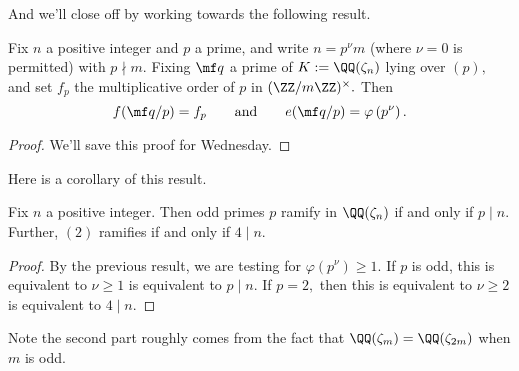 \documentclass[../notes.tex]{subfiles}
\begin{document}
And we'll close off by working towards the following result.
\begin{proposition}
	Fix $n$ a positive integer and $p$ a prime, and write $n=p^\nu m$ (where $\nu=0$ is permitted) with $p\nmid m.$ Fixing $\mf q$ a prime of $K:=\QQ(\zeta_n)$ lying over $(p),$ and set $f_p$ the multiplicative order of $p$ in $(\ZZ/m\ZZ)^\times.$ Then
	\[f(\mf q/p)=f_p\qquad\text{and}\qquad e(\mf q/p)=\varphi\left(p^\nu\right).\]
\end{proposition}
\begin{proof}
	We'll save this proof for Wednesday.
\end{proof}
Here is a corollary of this result.
\begin{corollary}
	Fix $n$ a positive integer. Then odd primes $p$ ramify in $\QQ(\zeta_n)$ if and only if $p\mid n.$ Further, $(2)$ ramifies if and only if $4\mid n.$
\end{corollary}
\begin{proof}
	By the previous result, we are testing for $\varphi\left(p^\nu\right)\ge1.$ If $p$ is odd, this is equivalent to $\nu\ge1$ is equivalent to $p\mid n.$ If $p=2,$ then this is equivalent to $\nu\ge2$ is equivalent to $4\mid n.$
\end{proof}
Note the second part roughly comes from the fact that $\QQ(\zeta_m)=\QQ(\zeta_{2m})$ when $m$ is odd.
\end{document}
